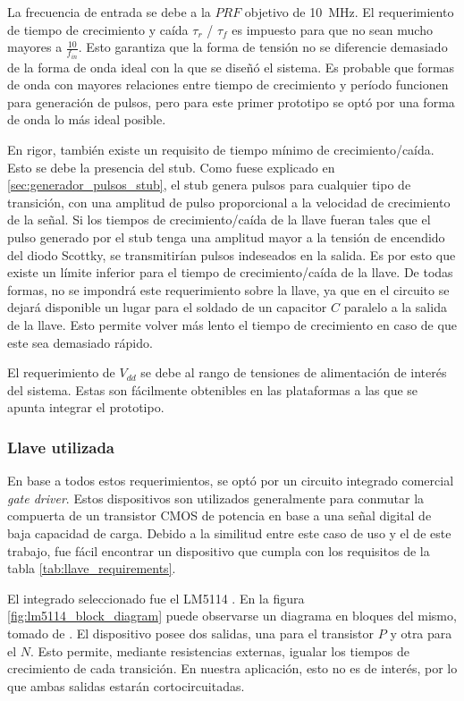La frecuencia de  entrada se debe a la $PRF$ objetivo de \qty{10}{\mega\hertz}.
El requerimiento de tiempo de crecimiento y caída $\tau_{r}$ / $\tau_{f}$ es
impuesto para que no sean mucho mayores a $\frac{10}{f_{in}}$. Esto garantiza
que la forma de tensión no se diferencie demasiado de la forma de onda ideal con
la que se diseñó el sistema. Es probable que formas de onda con mayores
relaciones entre tiempo de crecimiento y período funcionen para generación de
pulsos, pero para este primer prototipo se optó por una forma de onda lo más
ideal posible.

En rigor, también existe un requisito de tiempo mínimo de crecimiento/caída.
Esto se debe la presencia del stub. Como fuese explicado en
\ref{sec:generador_pulsos_stub}, el stub genera pulsos para cualquier tipo de
transición, con una amplitud de pulso proporcional a la velocidad de crecimiento
de la señal. Si los tiempos de crecimiento/caída de la llave fueran tales que el
pulso generado por el stub tenga una amplitud mayor a la tensión de encendido
del diodo Scottky, se transmitirían pulsos indeseados en la salida. Es por esto que
existe un límite inferior para el tiempo de crecimiento/caída de la llave. De
todas formas, no se impondrá  este requerimiento sobre la llave, ya que en el
circuito se dejará disponible un lugar para el soldado de un capacitor $C$
paralelo a la salida de la llave. Esto permite volver más lento el tiempo de
crecimiento en caso de que este sea demasiado rápido.

El requerimiento de $V_{dd}$ se debe al rango de tensiones de alimentación de
interés del sistema. Estas son fácilmente obtenibles en las plataformas a las
que se apunta integrar el prototipo.

\subsubsection{Llave utilizada}

En base a todos estos requerimientos, se optó por un circuito integrado
comercial \textit{gate driver}. Estos dispositivos son utilizados generalmente
para conmutar la compuerta de un transistor CMOS de potencia en base a  una
señal digital de baja capacidad de carga. Debido a la similitud entre este caso
de uso y el de este trabajo, fue fácil encontrar un dispositivo que cumpla con
los requisitos de la tabla \ref{tab:llave_requirements}.

El integrado seleccionado fue el LM5114 \cite{LM5114_datasheet}. En la figura
\ref{fig:lm5114_block_diagram} puede observarse un diagrama en bloques del
mismo, tomado de \cite{LM5114_datasheet}. El dispositivo posee dos salidas, una
para el transistor $P$ y otra para el $N$. Esto permite, mediante resistencias
externas, igualar los tiempos de crecimiento de cada transición. En nuestra
aplicación, esto no es de interés, por  lo que ambas salidas estarán
cortocircuitadas.


